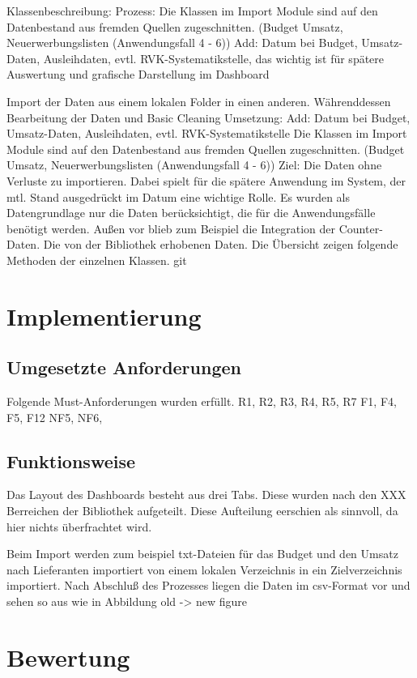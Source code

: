  
    Klassenbeschreibung:
    Prozess: Die Klassen im Import Module sind auf den Datenbestand aus fremden Quellen zugeschnitten.
    (Budget Umsatz, Neuerwerbungslisten (Anwendungsfall 4 - 6))
    Add: Datum bei Budget, Umsatz-Daten, Ausleihdaten, evtl. RVK-Systematikstelle, das wichtig ist für spätere Auswertung und grafische Darstellung
    im Dashboard
  
  
    Import der Daten aus einem lokalen Folder in einen anderen. 
    Währenddessen Bearbeitung der Daten und Basic Cleaning
    Umsetzung:
    Add: Datum bei Budget, Umsatz-Daten, Ausleihdaten, evtl. RVK-Systematikstelle 
    Die Klassen im Import Module sind auf den Datenbestand aus fremden Quellen zugeschnitten.
    (Budget Umsatz, Neuerwerbungslisten (Anwendungsfall 4 - 6))
    Ziel: Die Daten ohne Verluste zu importieren. Dabei spielt für die spätere Anwendung im System, der mtl. Stand
    ausgedrückt im Datum eine wichtige Rolle.
    Es wurden als Datengrundlage nur die Daten berücksichtigt, die für die Anwendungsfälle benötigt werden.
    Außen vor blieb zum Beispiel die Integration der Counter-Daten.
    Die von der Bibliothek erhobenen Daten. Die Übersicht zeigen folgende Methoden der einzelnen Klassen.
    git
    

\section{Implementierung}

  

    \subsection{Umgesetzte Anforderungen}
    Folgende Must-Anforderungen wurden erfüllt.
    R1, R2, R3, R4, R5, R7
    F1, F4, F5, F12
    NF5, NF6, 
    \subsection{Funktionsweise}
    Das Layout des Dashboards besteht aus drei Tabs. Diese wurden nach den XXX Berreichen der Bibliothek aufgeteilt. Diese Aufteilung eerschien als sinnvoll,
    da hier nichts überfrachtet wird.

    Beim Import werden zum beispiel txt-Dateien für das Budget und den Umsatz nach Lieferanten importiert von einem lokalen Verzeichnis
    in ein Zielverzeichnis importiert. Nach Abschluß des Prozesses liegen die Daten im csv-Format vor und sehen so aus wie in Abbildung
    old -> new
    figure
    
     



\section{Bewertung}
